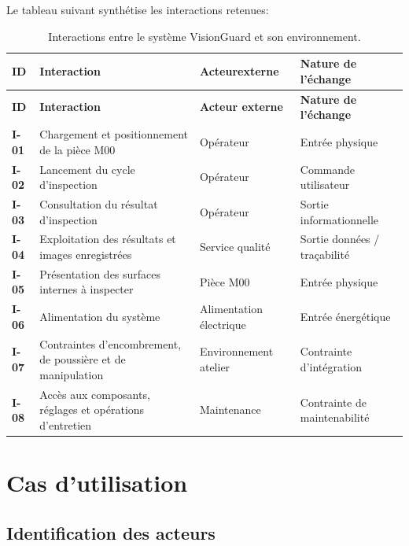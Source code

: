 Le tableau suivant synthétise les interactions retenues:
\vspace{-0.5cm}
\renewcommand{\arraystretch}{1.3}
\begin{longtable}{|p{1cm}|p{6cm}|p{3cm}|p{5cm}|}
\caption{Interactions entre le système VisionGuard et son environnement.}
\label{tab:interactions}\\
\hline
\rowcolor{navyblue}
\textbf{\color{white}ID} & \textbf{\color{white}Interaction} & \textbf{\color{white}Acteur\newline externe} & \textbf{\color{white}Nature de l'échange} \\
\hline
\endfirsthead
\hline
\rowcolor{navyblue}
\textbf{ID} & \textbf{Interaction} & \textbf{Acteur externe} & \textbf{Nature de l'échange} \\
\hline
\endhead
\hline
\endfoot
\textbf{I-01} & Chargement et positionnement de la pièce M00 & Opérateur & Entrée physique \\ \hline
\textbf{I-02} & Lancement du cycle d'inspection & Opérateur & Commande utilisateur \\ \hline
\textbf{I-03} & Consultation du résultat d'inspection & Opérateur & Sortie informationnelle \\ \hline
\textbf{I-04} & Exploitation des résultats et images enregistrées & Service qualité & Sortie données / traçabilité \\ \hline
\textbf{I-05} & Présentation des surfaces internes à inspecter & Pièce M00 & Entrée physique \\ \hline
\textbf{I-06} & Alimentation du système & Alimentation électrique & Entrée énergétique \\ \hline
\textbf{I-07} & Contraintes d'encombrement, de poussière et de manipulation & Environnement atelier & Contrainte d'intégration \\ \hline
\textbf{I-08} & Accès aux composants, réglages et opérations d'entretien & Maintenance & Contrainte de maintenabilité \\ \hline
\end{longtable}
\section{Cas d'utilisation}

\subsection{Identification des acteurs}

